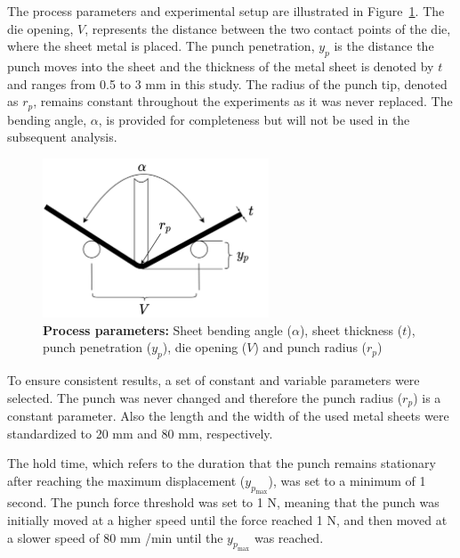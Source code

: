{The process parameters and experimental setup are illustrated in Figure~\ref{fig:process_parameters}.
The die opening, $V$, represents the distance between the two contact points of the die, where the sheet metal is
placed.
The punch penetration, $y_p$ is the distance the punch moves into the sheet and
the thickness of the metal sheet is denoted by $t$ and ranges from 0.5 to 3 mm in this study.
The radius of the punch tip, denoted as $r_p$, remains constant throughout the experiments as it was never replaced.
The bending angle, $\alpha$, is provided for completeness but will not be used in the subsequent analysis.

\begin{figure}[h]
    \begin{tcolorbox}[arc=0pt,boxrule=0.5pt]
        \centering
        \includegraphics[trim=left botm right top, width=0.6\textwidth,
            clip]{chap4/images/process_parameters}
    \end{tcolorbox}
    \caption{\textbf{Process parameters:} Sheet bending angle ($\alpha$), sheet
    thickness ($t$), punch
    penetration ($y_p$), die opening ($V$) and punch radius ($r_p$)}
    \label{fig:process_parameters}
\end{figure}

To ensure consistent results, a set of constant and variable parameters were selected.
The punch was never changed and therefore the punch radius ($r_p$) is a constant parameter.
Also the length and the width of the used metal sheets were standardized to 20 mm and 80 mm, respectively.

The hold time, which refers to the duration that the punch remains stationary
after reaching the maximum displacement ($y_p_{\max}$), was set to a minimum of 1 second.
The punch force threshold was set to 1 N, meaning that the punch was initially moved at
a higher speed until the force reached 1 N, and then moved at a slower speed of 80 mm
/min until the $y_p_{\max}$ was reached.

}
